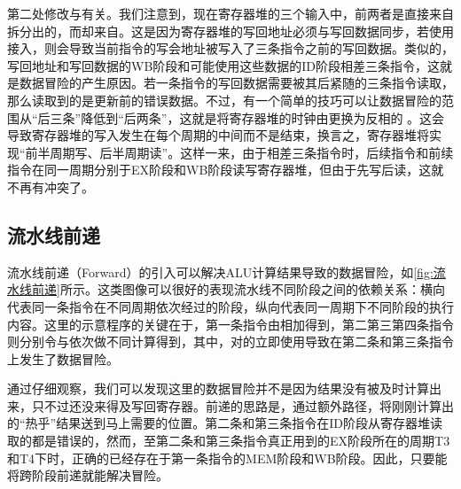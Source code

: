 第二处修改与有关。我们注意到，现在寄存器堆的三个输入中，前两者是直接来自拆分出的，而却来自。这是因为寄存器堆的写回地址必须与写回数据同步，若使用接入，则会导致当前指令的写会地址被写入了三条指令之前的写回数据。类似的，写回地址和写回数据的WB阶段和可能使用这些数据的ID阶段相差三条指令，这就是数据冒险的产生原因。若一条指令的写回数据需要被其后紧随的三条指令读取，那么读取到的是更新前的错误数据。不过，有一个简单的技巧可以让数据冒险的范围从“后三条”降低到“后两条”，这就是将寄存器堆的时钟由更换为反相的 \texttt{}。这会导致寄存器堆的写入发生在每个周期的中间而不是结束，换言之，寄存器堆将实现“前半周期写、后半周期读”。这样一来，由于相差三条指令时，后续指令和前续指令在同一周期分别于EX阶段和WB阶段读写寄存器堆，但由于先写后读，这就不再有冲突了。


\subsection{流水线前递}
流水线前递（Forward）的引入可以解决ALU计算结果导致的数据冒险，如\cref{fig:流水线前递}所示。这类图像可以很好的表现流水线不同阶段之间的依赖关系：横向代表同一条指令在不同周期依次经过的阶段，纵向代表同一周期下不同阶段的执行内容。这里的示意程序的关键在于，第一条指令由相加得到，第二第三第四条指令则分别令与依次做不同计算得到，其中，对的立即使用导致在第二条和第三条指令上发生了数据冒险。

通过仔细观察，我们可以发现这里的数据冒险并不是因为结果没有被及时计算出来，只不过还没来得及写回寄存器。前递的思路是，通过额外路径，将刚刚计算出的“热乎”结果送到马上需要的位置。第二条和第三条指令在ID阶段从寄存器堆读取的都是错误的，然而，至第二条和第三条指令真正用到的EX阶段所在的周期T3和T4下时，正确的已经存在于第一条指令的MEM阶段和WB阶段。因此，只要能将跨阶段前递就能解决冒险。

